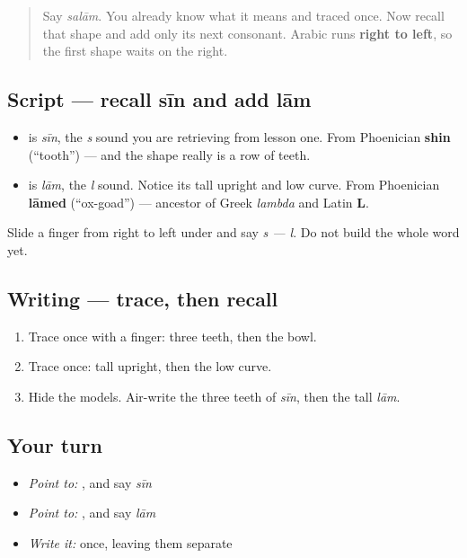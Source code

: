\label{lesson:AR-W00-sin-lam}



\begin{quote}
Say \emph{salām}. You already know what it means and traced \textbf{} once. Now recall that shape and add only its next consonant. Arabic runs \textbf{right to left}, so the first shape waits on the right.
\end{quote}

\subsection*{Script — recall sīn and add lām}
\begin{itemize}
\raggedright
  \item \textbf{} is \emph{sīn}, the \emph{s} sound you are retrieving from lesson one. From Phoenician \textbf{shin} (\textquotedblleft{}tooth\textquotedblright{}) — and the shape really is a row of teeth.
  \item \textbf{} is \emph{lām}, the \emph{l} sound. Notice its tall upright and low curve. From Phoenician \textbf{lāmed} (\textquotedblleft{}ox-goad\textquotedblright{}) — ancestor of Greek \emph{lambda} and Latin \textbf{L}.
\end{itemize}

Slide a finger from right to left under \textbf{ } and say \emph{s — l}. Do not build the whole word yet.

\subsection*{Writing — trace, then recall}

\begin{enumerate}
\raggedright
  \item Trace \textbf{} once with a finger: three teeth, then the bowl.
  \item Trace \textbf{} once: tall upright, then the low curve.
  \item Hide the models. Air-write the three teeth of \emph{sīn}, then the tall \emph{lām}.
\end{enumerate}

\subsection*{Your turn}
\begin{itemize}
\raggedright
  \item \emph{Point to:} \textbf{}, and say \emph{sīn}
  \item \emph{Point to:} \textbf{}, and say \emph{lām}
  \item \emph{Write it:} \textbf{ } once, leaving them separate
\end{itemize}

